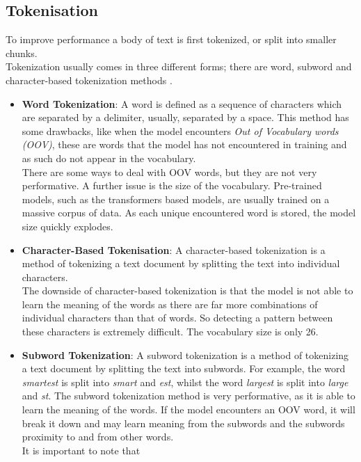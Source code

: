 \subsection{Tokenisation}
\label{sec:tokenisation}
To improve performance a body of text is first tokenized, or split into smaller chunks.\\
Tokenization usually comes in three different forms; there are word, subword and character-based tokenization methods \autocite{WhatTokenizationTokenization2020}.
\begin{itemize}
	\item \textbf{Word Tokenization}: A word is defined as a sequence of characters which are separated by a delimiter, usually, separated by a space.
	      This method has some drawbacks, like when the model encounters \emph{Out of Vocabulary words (OOV)}, these are words that the model has not encountered
	      in training and as such do not appear in the vocabulary.\\ There are some ways to deal with OOV words, but they are not very performative.
	      \bigbreak
	      A further issue is the size of the vocabulary. Pre-trained models, such as the transformers based models, are usually trained on a massive corpus of
	      data. As each unique encountered word is stored, the model size quickly explodes.
	\item \textbf{Character-Based Tokenisation}: A character-based tokenization is a method of tokenizing a text document by splitting the text into
	      individual characters. \\
	      The downside of character-based tokenization is that the model is not able to learn the meaning of the words as there are far more combinations of
	      individual characters than that of words. So detecting a pattern between these characters is extremely difficult. The vocabulary size is only
	      26.
	\item \textbf{Subword Tokenization}: A subword tokenization is a method of tokenizing a text document by splitting the text into subwords.
	      For example, the word \emph{smartest} is split into \emph{smart} and \emph{est}, whilst the word \emph{largest} is split into \emph{large} and \emph{st}.
	      The subword tokenization method is very performative, as it is able to learn the meaning of the words. If the model encounters an OOV word, it
	      will break it down and may learn meaning from the subwords and the subwords proximity to and from other words. \\
	      It is important to note that

\end{itemize}
